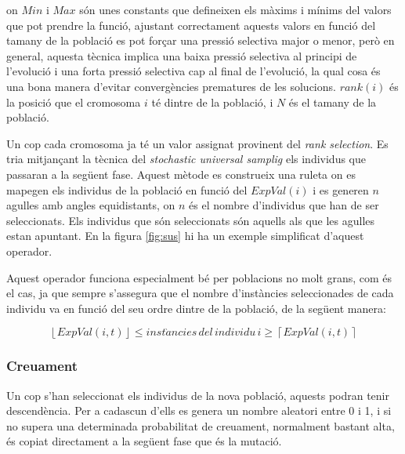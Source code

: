 \documentclass[titlepage,a4paper,12pt]{book}
\begin{document}
on $Min$ i $Max$ són unes constants que defineixen els màxims i mínims del
valors que pot prendre la funció, ajustant correctament aquests valors en funció
del tamany de la població es pot forçar una pressió selectiva major o menor,
però en general, aquesta tècnica implica una baixa pressió selectiva al principi
de l'evolució i una forta pressió selectiva cap al final de l'evolució, la qual
cosa és una bona manera d'evitar convergències prematures de les solucions.
$rank(i)$ és la posició que el cromosoma $i$ té dintre de la població, i $N$ és
el tamany de la població.

Un cop cada cromosoma ja té un valor assignat provinent del \emph{rank
selection}. Es tria mitjançant la tècnica del \emph{stochastic universal
samplig} els individus que passaran a la següent fase. Aquest mètode es
construeix una ruleta on es mapegen els individus de la població en funció del
$ExpVal(i)$ i es generen $n$ agulles amb angles equidistants, on $n$ és el
nombre d'individus que han de ser seleccionats. Els individus que són
seleccionats són aquells als que les agulles estan apuntant. En la figura
\ref{fig:sus} hi ha un exemple simplificat d'aquest operador.


Aquest operador funciona especialment bé per poblacions no molt grans, com és el
cas, ja que sempre s'assegura que el nombre d'instàncies seleccionades de cada
individu va en funció del seu ordre dintre de la població, de la següent manera:

\[\left\lfloor ExpVal(i,t)\right\rfloor \leq inst\grave{a}ncies\, del\,
individu\, i\geq \left\lceil ExpVal(i,t)\right\rceil \]

\subsubsection{Creuament}

Un cop s'han seleccionat els individus de la nova població, aquests podran tenir
descendència. Per a cadascun d'ells es genera un nombre aleatori entre 0 i 1, i
si no supera una determinada probabilitat de creuament, normalment bastant alta,
és copiat directament a la següent fase que és la mutació.
\end{document}
